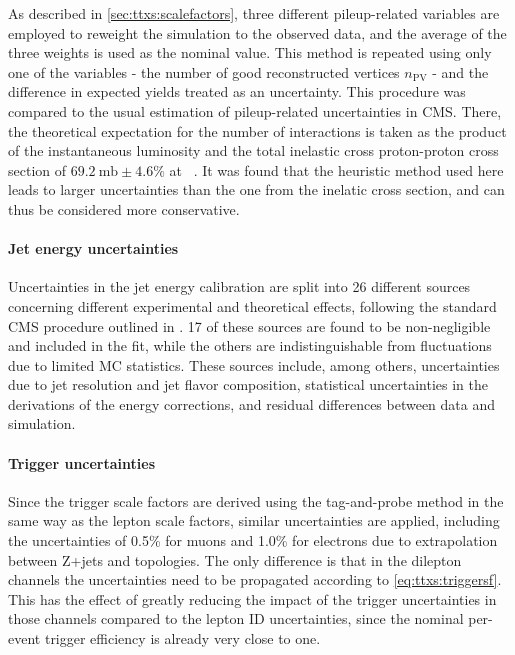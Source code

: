 As described in \cref{sec:ttxs:scalefactors}, three different pileup-related variables are employed to reweight the simulation to the observed data, and the average of the three weights is used as the nominal value. This method is repeated using only one of the variables - the number of good reconstructed vertices $n_{\mathrm{PV}}$ - and the difference in expected yields treated as an uncertainty. 
This procedure was compared to the usual estimation of pileup-related uncertainties in CMS. There, the theoretical expectation for the number of interactions %
is taken as the product of the instantaneous luminosity and the total inelastic cross proton-proton cross section of $\SI{69.2}{\milli\barn} \pm 4.6 \%$ at \sqrtsRII~\cite{CMS:LUM-17-003}. It was found that the heuristic method used here leads to
larger uncertainties than the one from the inelatic cross section, and can thus be considered more conservative.

\paragraph{Jet energy uncertainties}

Uncertainties in the jet energy calibration are split into 26 different sources concerning different experimental and theoretical effects, following the standard CMS procedure outlined in . 17 of these sources are found to be non-negligible and included in the fit, while the others are indistinguishable from fluctuations due to limited MC statistics. These sources include, among others, uncertainties due to jet \pt resolution and jet flavor composition, statistical uncertainties in the derivations of the energy corrections, and residual differences between data and simulation.

\paragraph{Trigger uncertainties}

Since the trigger scale factors are derived using the tag-and-probe method in the same way as the lepton scale factors, similar uncertainties are applied, including the uncertainties of 0.5\% for muons and 1.0\% for electrons due to extrapolation between Z+jets and \ttbar topologies. The only difference is that in the dilepton channels the uncertainties need to be propagated according to \cref{eq:ttxs:triggersf}. This has the effect of greatly reducing the impact of the trigger uncertainties in those channels compared to the lepton ID uncertainties, since the nominal per-event trigger efficiency is already very close to one.

